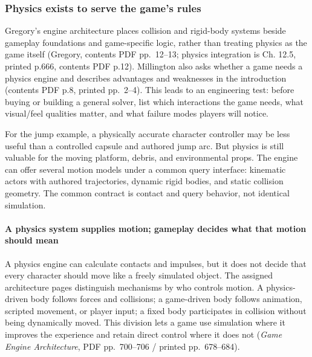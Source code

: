 \subsubsection{Physics exists to serve the game's rules}\label{06-engine-ii-ch033-physics-exists-to-serve-the-games-rules}

Gregory's engine architecture places collision and rigid-body systems beside gameplay foundations and game-specific logic, rather than treating physics as the game itself (Gregory, contents PDF pp.~12--13; physics integration is Ch. 12.5, printed p.666, contents PDF p.12). Millington also asks whether a game needs a physics engine and describes advantages and weaknesses in the introduction (contents PDF p.8, printed pp.~2--4). This leads to an engineering test: before buying or building a general solver, list which interactions the game needs, what visual/feel qualities matter, and what failure modes players will notice.

For the jump example, a physically accurate character controller may be less useful than a controlled capsule and authored jump arc. But physics is still valuable for the moving platform, debris, and environmental props. The engine can offer several motion models under a common query interface: kinematic actors with authored trajectories, dynamic rigid bodies, and static collision geometry. The common contract is contact and query behavior, not identical simulation.

\paragraph{A physics system supplies motion; gameplay decides what that motion should mean}\label{06-engine-ii-ch033-a-physics-system-supplies-motion-gameplay-decides-what-that-motion-should-mean}

A physics engine can calculate contacts and impulses, but it does not decide that every character should move like a freely simulated object. The assigned architecture pages distinguish mechanisms by who controls motion. A physics-driven body follows forces and collisions; a game-driven body follows animation, scripted movement, or player input; a fixed body participates in collision without being dynamically moved. This division lets a game use simulation where it improves the experience and retain direct control where it does not (\emph{Game Engine Architecture}, PDF pp.~700--706 / printed pp.~678--684).

